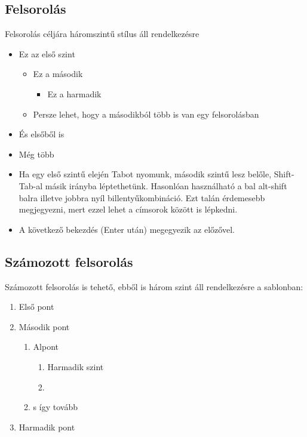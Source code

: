 \documentclass[a4paper, 12pt]{article}
\begin{document}
	\subsection{Felsorolás}
	Felsorolás céljára háromszintű stílus áll rendelkezésre
	\begin{itemize}[label=\color{bme}$\bullet$]
		\item Ez az első szint
		\begin{itemize}[label=$\square$]
			\item Ez a második
			\begin{itemize}[label=\color{bme}$\blacksquare$]
				\item Ez a harmadik
			\end{itemize} 
			\item Persze lehet, hogy a másodikból több is van egy felsorolásban
		\end{itemize}
		\item És elsőből is
		\item Még több
		\item Ha egy első szintű elején Tabot nyomunk, második szintű lesz belőle, Shift-Tab-al másik irányba léptethetünk.
		Hasonlóan használható a bal alt-shift balra illetve jobbra nyíl billentyűkombináció.
		Ezt talán érdemesebb megjegyezni, mert ezzel lehet a címsorok között is lépkedni.
		\item A következő bekezdés (Enter után) megegyezik az előzővel.
	\end{itemize}

	\subsection{Számozott felsorolás}
	Számozott felsorolás is tehető, ebből is három szint áll rendelkezésre a sablonban:
		\begin{enumerate}[label=\color{bme}\arabic*.]
			\item Első pont
			\item Második pont
			\begin{enumerate}[label=\color{bme}\alph*)]
				\item Alpont
				\begin{enumerate}[label=\color{bme}\roman*.]
					\item Harmadik szint
					\item 
				\end{enumerate}
				\item s így tovább
			\end{enumerate}
			\item Harmadik pont
		\end{enumerate}
	\newpage
\end{document}
